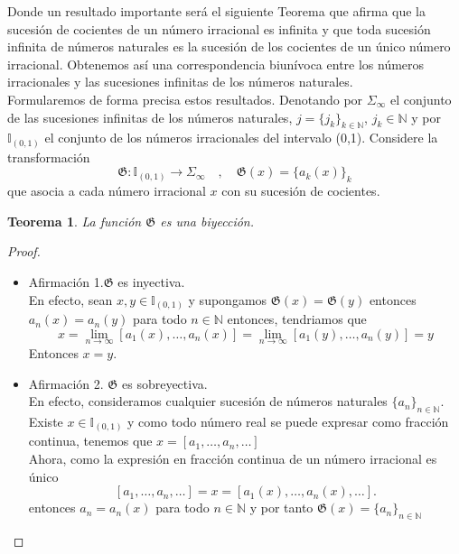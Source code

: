 \documentclass[12pt]{report}
\newtheorem{teo}{Teorema}[section]
\begin{document}
Donde un resultado importante será el siguiente Teorema que afirma que la sucesión de cocientes de un número irracional es infinita y que toda sucesión infinita de números naturales es la sucesión de los cocientes de un único número irracional. Obtenemos así una correspondencia biunívoca entre los números irracionales y las sucesiones infinitas de los números naturales.
\\

Formularemos de forma precisa estos resultados. Denotando por $\Sigma_{\infty}$ el conjunto de las sucesiones infinitas de los números naturales, $j=\{j_{k}\}_{k\in\mathbb{N}}$, $j_{k}\in\mathbb{N}$ y por $\mathbb{I}_{(0,1)}$ el conjunto de los números irracionales del intervalo (0,1). Considere la transformación
$$
\mathfrak{G}:\mathbb{I}_{(0,1)}\longrightarrow\Sigma_{\infty} \quad,\quad \mathfrak{G}(x)=\{a_{k}(x)\}_{k}
$$
que asocia a cada número irracional $x$ con su sucesión de cocientes.

\begin{teo}
La función $\mathfrak{G}$ es una biyección.
\label{teo3-1}
\end{teo}

\begin{proof}\hfill
\begin{itemize}
    \item[]Afirmación 1.$\mathfrak{G}$ es inyectiva. \\
    En efecto, sean $x,y\in\mathbb{I}_{(0,1)}$ y supongamos $\mathfrak{G}(x)=\mathfrak{G}(y)$ entonces  $a_{n}(x)=a_{n}(y)$ para todo $n\in\mathbb{N}$ entonces, tendriamos que $$
    x=\displaystyle\lim_{n\to\infty}[a_{1}(x),\ldots,a_{n}(x)]=\displaystyle\lim_{n\to\infty}[a_{1}(y),\ldots,a_{n}(y)]=y
    $$
    Entonces $x=y$.
    \item[]Afirmación 2. $\mathfrak{G}$ es sobreyectiva.
    \\
    En efecto, consideramos cualquier sucesión de números naturales $\{a_{n}\}_{n\in\mathbb{N}}$. Existe $x\in\mathbb{I}_{(0,1)}$ y como todo número real se puede expresar como fracción continua, tenemos que $x=[a_{1},\ldots,a_{n},\ldots]$\\
    Ahora, como la expresión en fracción continua de un número irracional es único $$[a_{1},\ldots,a_{n},\ldots]=x=[a_{1}(x),\ldots,a_{n}(x),\ldots].$$
    entonces $a_{n}=a_{n}(x)$ para todo $n\in\mathbb{N}$  y por tanto $\mathfrak{G}(x)=\{a_{n}\}_{n\in\mathbb{N}}$
\end{itemize} 
\end{proof}
\end{document}

